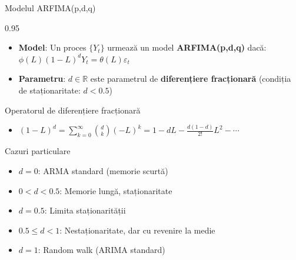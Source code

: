 \documentclass[9pt, aspectratio=169, t]{beamer}
\begin{document}
\begin{frame}{Modelul ARFIMA(p,d,q)}
    \begin{cminipage}{0.95\textwidth}
        \vspace{-0.3cm}
        {\small
        \begin{defn}[ARFIMA]
            \begin{itemize}\setlength{\itemsep}{0pt}
                \item \textbf{Model}: Un proces $\{Y_t\}$ urmează un model \textbf{ARFIMA(p,d,q)} dacă:
                $\phi(L)(1-L)^d Y_t = \theta(L)\varepsilon_t$
                \item \textbf{Parametru}: $d \in \mathbb{R}$ este parametrul de \textbf{diferențiere fracționară} (condiția de staționaritate: $d < 0.5$)
            \end{itemize}
        \end{defn}
        }
        \vspace{-0.1cm}
        {\footnotesize
        \begin{block}{Operatorul de diferențiere fracționară}
            \begin{itemize}\setlength{\itemsep}{0pt}
                \item $(1-L)^d = \sum_{k=0}^{\infty} \binom{d}{k}(-L)^k = 1 - dL - \frac{d(1-d)}{2!}L^2 - \cdots$
            \end{itemize}
        \end{block}
        }
        \vspace{-0.1cm}
        {\scriptsize
        \begin{block}{Cazuri particulare}
            \begin{itemize}\setlength{\itemsep}{0pt}
                \item $d = 0$: ARMA standard (memorie scurtă)
                \item $0 < d < 0.5$: Memorie lungă, staționaritate
                \item $d = 0.5$: Limita staționarității
                \item $0.5 \leq d < 1$: Nestaționaritate, dar cu revenire la medie
                \item $d = 1$: Random walk (ARIMA standard)
            \end{itemize}
        \end{block}
        }
    \end{cminipage}
\end{frame}
\end{document}
